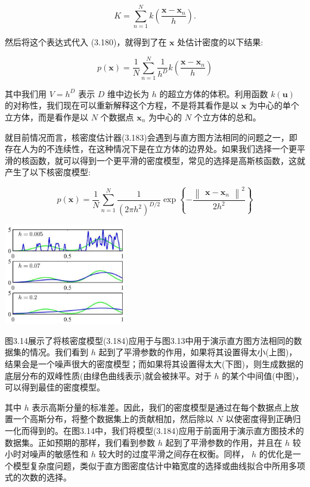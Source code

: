 \documentclass[10pt]{report}
\begin{document}
\[
K = \mathop{\sum }\limits_{{n = 1}}^{N}k\left( \frac{\mathbf{x} - {\mathbf{x}}_{n}}{h}\right) . \tag{3.182}
\]

然后将这个表达式代入 (3.180)，就得到了在 \(\mathbf{x}\) 处估计密度的以下结果:

\[
p\left( \mathbf{x}\right)  = \frac{1}{N}\mathop{\sum }\limits_{{n = 1}}^{N}\frac{1}{{h}^{D}}k\left( \frac{\mathbf{x} - {\mathbf{x}}_{n}}{h}\right)  \tag{3.183}
\]

其中我们用 \(V = {h}^{D}\) 表示 \(D\) 维中边长为 \(h\) 的超立方体的体积。利用函数 \(k\left( \mathbf{u}\right)\) 的对称性，我们现在可以重新解释这个方程，不是将其看作是以 \(\mathbf{x}\) 为中心的单个立方体，而是看作是以 \(N\) 个数据点 \({\mathbf{x}}_{n}\) 为中心的 \(N\) 个立方体的总和。

就目前情况而言，核密度估计器(3.183)会遇到与直方图方法相同的问题之一，即存在人为的不连续性，在这种情况下是在立方体的边界处。如果我们选择一个更平滑的核函数，就可以得到一个更平滑的密度模型，常见的选择是高斯核函数，这就产生了以下核密度模型:

\[
p\left( \mathbf{x}\right)  = \frac{1}{N}\mathop{\sum }\limits_{{n = 1}}^{N}\frac{1}{{\left( 2\pi {h}^{2}\right) }^{D/2}}\exp \left\{  {-\frac{{\begin{Vmatrix}\mathbf{x} - {\mathbf{x}}_{n}\end{Vmatrix}}^{2}}{2{h}^{2}}}\right\}   \tag{3.184}
\]

\begin{center}
\includegraphics[max width=0.4\textwidth]{images/0194e279-9b28-703a-88f4-c3ac21e2010d_121_942_368_551_454_0.jpg}
\end{center}
\hspace*{3em} 

图3.14展示了将核密度模型(3.184)应用于与图3.13中用于演示直方图方法相同的数据集的情况。我们看到 \(h\) 起到了平滑参数的作用，如果将其设置得太小(上图)，结果会是一个噪声很大的密度模型；而如果将其设置得太大(下图)，则生成数据的底层分布的双峰性质(由绿色曲线表示)就会被抹平。对于 \(h\) 的某个中间值(中图)，可以得到最佳的密度模型。

其中 \(h\) 表示高斯分量的标准差。因此，我们的密度模型是通过在每个数据点上放置一个高斯分布，将整个数据集上的贡献相加，然后除以 \(N\) 以使密度得到正确归一化而得到的。在图3.14中，我们将模型(3.184)应用于前面用于演示直方图技术的数据集。正如预期的那样，我们看到参数 \(h\) 起到了平滑参数的作用，并且在 \(h\) 较小时对噪声的敏感性和 \(h\) 较大时的过度平滑之间存在权衡。同样， \(h\) 的优化是一个模型复杂度问题，类似于直方图密度估计中箱宽度的选择或曲线拟合中所用多项式的次数的选择。
\end{document}
